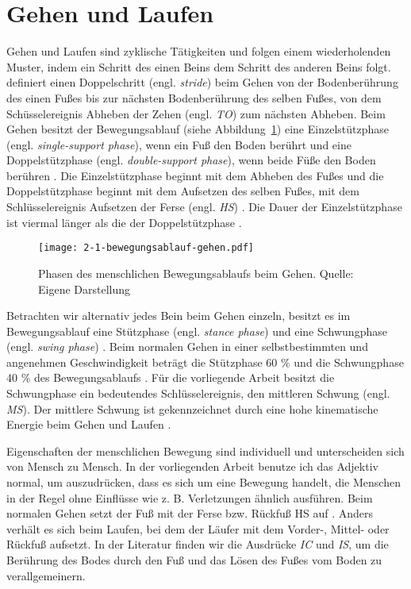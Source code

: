 \section{Gehen und Laufen}
\label{sec:gehen_und_laufen}

Gehen und Laufen sind zyklische Tätigkeiten und folgen einem wiederholenden Muster, indem ein Schritt des einen Beins dem Schritt des anderen Beins folgt. \citet[][S.~9]{Bartlett2007} definiert einen Doppelschritt (engl. \emph{stride}) beim Gehen von der Bodenberührung des einen Fußes bis zur nächsten Bodenberührung des selben Fußes, von dem Schüsselereignis Abheben der Zehen (engl. \emph{\ac{TO}}) zum nächsten Abheben. Beim Gehen besitzt der Bewegungsablauf (siehe Abbildung~\ref{fig:2-1-bewegungsablauf-gehen}) eine Einzelstützphase (engl. \emph{single-support phase}), wenn ein Fuß den Boden berührt und eine Doppelstützphase (engl. \emph{double-support phase}), wenn beide Füße den Boden berühren \citep[vgl.][]{Bartlett2007}. Die Einzelstützphase beginnt mit dem Abheben des Fußes und die Doppelstützphase beginnt mit dem Aufsetzen des selben Fußes, mit dem Schlüsselereignis Aufsetzen der Ferse (engl. \emph{\ac{HS}}) \citep[vgl.][]{Bartlett2007}. Die Dauer der Einzelstützphase ist viermal länger als die der Doppelstützphase \citep[vgl.][]{Bartlett2007}.

\begin{figure}[t]
	\centering
		\texttt{[image: 2-1-bewegungsablauf-gehen.pdf]}
	\caption[Phasen des menschlichen Bewegungsablaufs beim Gehen]{Phasen des menschlichen Bewegungsablaufs beim Gehen. Quelle: Eigene Darstellung}
	\label{fig:2-1-bewegungsablauf-gehen}
\end{figure}

Betrachten wir alternativ jedes Bein beim Gehen einzeln, besitzt es im Bewegungsablauf eine Stützphase (engl. \emph{stance phase}) und eine Schwungphase (engl. \emph{swing phase}) \citep[vgl.][]{Bartlett2007}. Beim normalen Gehen in einer selbstbestimmten und angenehmen Geschwindigkeit beträgt die Stützphase 60 \% und die Schwungphase 40 \% des Bewegungsablaufs \citep[vgl.][]{Bartlett2007}. Für die vorliegende Arbeit besitzt die Schwungphase ein bedeutendes Schlüsselereignis, den mittleren Schwung (engl. \emph{MS}). Der mittlere Schwung ist gekennzeichnet durch eine hohe kinematische Energie beim Gehen und Laufen \citep[vgl.][]{Novacheck1998}.

Eigenschaften der menschlichen Bewegung sind individuell und unterscheiden sich von Mensch zu Mensch. In der vorliegenden Arbeit benutze ich das Adjektiv normal, um auszudrücken, dass es sich um eine Bewegung handelt, die Menschen in der Regel ohne Einflüsse wie z. B. Verletzungen ähnlich ausführen. Beim normalen Gehen setzt der Fuß mit der Ferse bzw. Rückfuß \ac{HS} auf \citep[vgl.][S.~33]{Marquardt2011}. Anders verhält es sich beim Laufen, bei dem der Läufer mit dem Vorder-, Mittel- oder Rückfuß aufsetzt. In der Literatur finden wir die Ausdrücke \emph{\ac{IC}} und \emph{\ac{IS}}, um die Berührung des Bodes durch den Fuß und das Lösen des Fußes vom Boden zu verallgemeinern.

